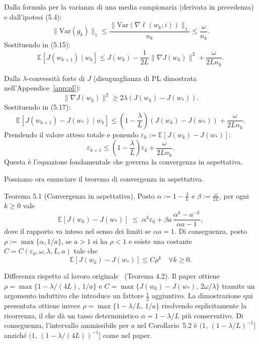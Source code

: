\documentclass[italian, a4paper, twoside, binding=6mm]{sapthesis}
\begin{document}
Dalla formula per la varianza di una media campionaria (derivata in precedenza) e dall'ipotesi (5.4):
\[
\|\mathrm{Var}(g_k)\|_1 \le \frac{\|\mathrm{Var}(\nabla \ell(w_k;i))\|_1}{n_k} \le \frac{\omega}{n_k}. \tag{5.16}
\]
Sostituendo in (5.15):
\[
\mathbb{E}[J(w_{k+1}) \mid w_k] \le J(w_k) - \frac{1}{2L}\|\nabla J(w_k)\|^2 + \frac{\omega}{2L n_k}. \tag{5.17}
\]

Dalla \(\lambda\)-convessità forte di \(J\) (disuguaglianza di PL dimostrata nell'Appendice~\ref{app:pl}):
\[
\|\nabla J(w_k)\|^2 \ge 2\lambda (J(w_k) - J(w_*)). \tag{5.18}
\]
Sostituendo in (5.17):
\[
\mathbb{E}[J(w_{k+1}) - J(w_*) \mid w_k] \le \left(1 - \frac{\lambda}{L}\right)(J(w_k) - J(w_*)) + \frac{\omega}{2L n_k}. \tag{5.19}
\]
Prendendo il valore atteso totale e ponendo \(\varepsilon_k := \mathbb{E}[J(w_k) - J(w_*)]\):
\[
\varepsilon_{k+1} \le \left(1 - \frac{\lambda}{L}\right)\varepsilon_k + \frac{\omega}{2L n_k}. \tag{5.20}
\]
Questa è l'equazione fondamentale che governa la convergenza in aspettativa.

Possiamo ora enunciare il teorema di convergenza in aspettativa.

\begin{thmbox}
Teorema 5.1 (Convergenza in aspettativa).
Posto $\alpha := 1-\frac{\lambda}{L}$ e $\beta := \frac{\omega}{2L}$, per ogni $k\ge 0$ vale
\[
\mathbb{E}[J(w_k)-J(w_*)] \;\le\; \alpha^k\varepsilon_0
+ \beta a\,\frac{\alpha^k-a^{-k}}{\alpha a-1},
\tag{5.21}
\]
dove il rapporto va inteso nel senso dei limiti se $\alpha a=1$.
Di conseguenza, posto $\rho:=\max\{\alpha,1/a\}$, se $a>1$ si ha $\rho<1$ e
esiste una costante $C=C(\varepsilon_0,\omega,\lambda,L,a)$ tale che
\[
\mathbb{E}[J(w_k)-J(w_*)]\le C\rho^k\quad\forall k\ge0.
\]
\end{thmbox}

\begin{notebox}
  Differenza rispetto al lavoro originale~\cite{byrd2012} (Teorema 4.2).
  Il paper ottiene \(\rho = \max\{1-\lambda/(4L),\,1/a\}\) e \(C = \max\{J(w_0)-J(w_*),\,2\omega/\lambda\}\) tramite un argomento induttivo che introduce un fattore \(\tfrac{1}{2}\) aggiuntivo. La dimostrazione qui presentata ottiene invece \(\rho = \max\{1-\lambda/L,\,1/a\}\) risolvendo esplicitamente la ricorrenza, il che dà un tasso deterministico \(\alpha = 1-\lambda/L\) più conservativo. Di conseguenza, l'intervallo ammissibile per \(a\) nel Corollario~5.2 è \((1,\,(1-\lambda/L)^{-1}]\) anziché \((1,\,(1-\lambda/(4L))^{-1}]\) come nel paper.
\end{notebox}
\end{document}
